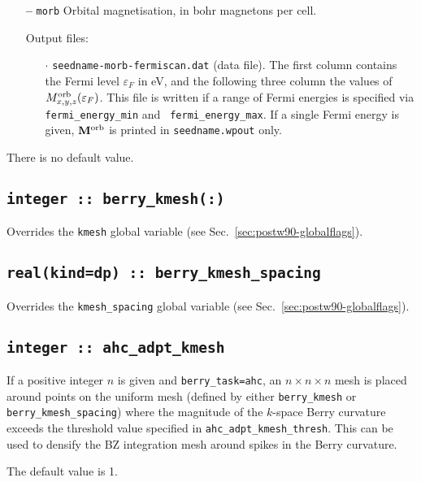 \begin{itemize}
\begin{itemize}
\end{itemize}

\item[{\bf --}] \verb#morb# Orbital magnetisation, in bohr magnetons
  per cell.

Output files:

\begin{itemize}

\item[$\cdot$] {\tt seedname-morb-fermiscan.dat} (data file). The
  first column contains the Fermi level $\varepsilon_F$ in eV, and the
  following three column the values of $M^{\rm
    orb}_{x,y,z}(\varepsilon_F)$.  This file is written if a range of
  Fermi energies is specified via {\tt fermi\_energy\_min} and {\tt
    fermi\_energy\_max}.  If a single Fermi energy is given, ${\bf
    M}^{\rm orb}$ is printed in {\tt seedname.wpout} only.

\end{itemize}

\end{itemize}
There is no default value.


\subsection[berry\_kmesh]{\tt integer :: berry\_kmesh(:)}
Overrides the \verb#kmesh# global variable (see
Sec.~\ref{sec:postw90-globalflags}).

\subsection[berry\_kmesh\_spacing]{\tt real(kind=dp) ::
  berry\_kmesh\_spacing}
Overrides the \verb#kmesh_spacing# global variable (see
Sec.~\ref{sec:postw90-globalflags}).


\subsection[berry\_adpt\_kmesh]{\tt integer :: ahc\_adpt\_kmesh}
If a positive integer $n$ is given and {\tt berry\_task=ahc}, an
$n\times n\times n$ mesh is placed around points on the uniform mesh
(defined by either {\tt berry\_kmesh} or {\tt berry\_kmesh\_spacing})
where the magnitude of the $k$-space Berry curvature exceeds the
threshold value specified in {\tt ahc\_adpt\_kmesh\_thresh}. This can
be used to densify the BZ integration mesh around spikes in the Berry
curvature.

The default value is 1.


